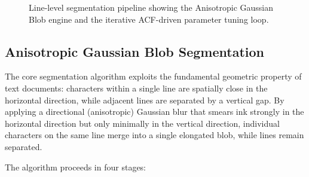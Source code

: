 \documentclass[12pt, a4paper]{article}
\begin{document}
\begin{figure}[H]
    \centering
    \caption{Line-level segmentation pipeline showing the Anisotropic Gaussian Blob engine and the iterative ACF-driven parameter tuning loop.}
    \label{fig:seg_pipeline}
\end{figure}


\subsection{Anisotropic Gaussian Blob Segmentation}

The core segmentation algorithm exploits the fundamental geometric property of text documents: characters within a single line are spatially close in the horizontal direction, while adjacent lines are separated by a vertical gap. By applying a directional (anisotropic) Gaussian blur that smears ink strongly in the horizontal direction but only minimally in the vertical direction, individual characters on the same line merge into a single elongated blob, while lines remain separated.

The algorithm proceeds in four stages:
\end{document}
